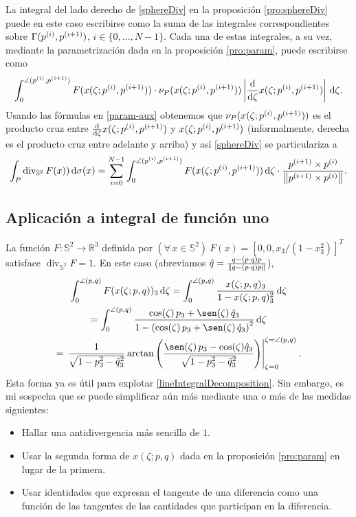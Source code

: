 \documentclass[reqno]{amsart}
\newcommand{\dd}[1][y]{\if#1y\,\fi{\mathrm d}} %
\newcommand{\norm}[2][y]{\if#1y\left\fi\lVert#2\if#1y\right\fi\rVert} %
\newcommand{\abs}[2][y]{\if#1y\left\fi\lvert#2\if#1y\right\fi\rvert} %
\newcommand{\psp}[1]{\sp{(#1)}} %
\begin{document}
La integral del lado derecho de \eqref{sphereDiv} en la proposición \ref{pro:sphereDiv} puede en este caso escribirse como la suma de las integrales correspondientes sobre $\Gamma(p\psp{i}, p\psp{i+1})$, $i \in \{0, \dotsc, N-1\}$.
Cada una de estas integrales, a su vez, mediante la parametrización dada en la proposición \ref{pro:param}, puede escribirse como
%
\begin{equation*}
\int_0^{\angle(p\psp{i}, p\psp{i+1})} F(x(\zeta;p\psp{i},p\psp{i+1})) \cdot \nu_P(x(\zeta;p\psp{i},p\psp{i+1})) \abs{\frac{\mathrm{d}}{\mathrm{d}\zeta} x(\zeta;p\psp{i},p\psp{i+1})} \dd \zeta.
\end{equation*}
%
Usando las fórmulas en \eqref{param-aux} obtenemos que $\nu_P(x(\zeta;p\psp{i},p\psp{i+1}))$ es el producto cruz entre $\frac{\mathrm{d}}{\mathrm{d}\zeta} x(\zeta;p\psp{i},p\psp{i+1})$ y $x(\zeta;p\psp{i},p\psp{i+1})$ (informalmente, derecha es el producto cruz entre adelante y arriba) y así \eqref{sphereDiv} se particulariza a
%
\begin{equation}\label{lineIntegralDecomposition}
\int_P \operatorname{div}_{\mathbb{S}^2} F(x)) \dd\sigma(x)
= \sum_{i=0}^{N-1} \int_0^{\angle(p\psp{i},p\psp{i+1})} F(x(\zeta;p\psp{i},p\psp{i+1})) \dd \zeta \cdot \frac{p\psp{i+1} \times p\psp{i}}{\norm{p\psp{i+1} \times p\psp{i}}}.
\end{equation}
%

\subsection{Aplicación a integral de función uno}

La función $F \colon \mathbb{S}^2 \to \mathbb{R}^3$ definida por $(\forall\,x\in\mathbb{S}^2)\ F(x) = [0, 0, x_3/(1-x_3^2)]^T$ satisface $\operatorname{div}_{\mathbb{S}^2} F = 1$.
En este caso (abreviamos $\hat q = \frac{q - (p\cdot q)p}{\norm{q - (p\cdot q)p}}$),
%
\begin{multline}\label{aux-1}
\int_0^{\angle(p,q)} F(x(\zeta;p,q))_3 \dd \zeta
= \int_0^{\angle(p,q)} \frac{x(\zeta;p,q)_3}{1-x(\zeta;p,q)_3^2} \dd\zeta\\
= \int_0^{\angle(p,q)} \frac{\cos(\zeta) \, p_3 + \sen(\zeta) \, \hat q_3}{1 - \left(\cos(\zeta) \, p_3 + \sen(\zeta) \, \hat q_3\right)^2} \dd \zeta\\
= \left. \frac{1}{\sqrt{1 - p_3^2 - \hat q_3^2}} \arctan\left( \frac{\sen(\zeta) \, p_3 - \cos(\zeta) \hat q_3}{\sqrt{1 - p_3^2 - \hat q_3^2}} \right) \right|_{\zeta=0}^{\zeta=\angle(p,q)}.
\end{multline}
%
Esta forma ya es útil para explotar \eqref{lineIntegralDecomposition}.
Sin embargo, es mi sospecha que se puede simplificar aún más mediante una o más de las medidas siguientes:
\begin{itemize}
\item Hallar una antidivergencia más sencilla de $1$.
\item Usar la segunda forma de $x(\zeta;p,q)$ dada en la proposición \ref{pro:param} en lugar de la primera.
\item Usar identidades que expresan el tangente de una diferencia como una función de las tangentes de las cantidades que participan en la diferencia.
\end{itemize}
\end{document}
